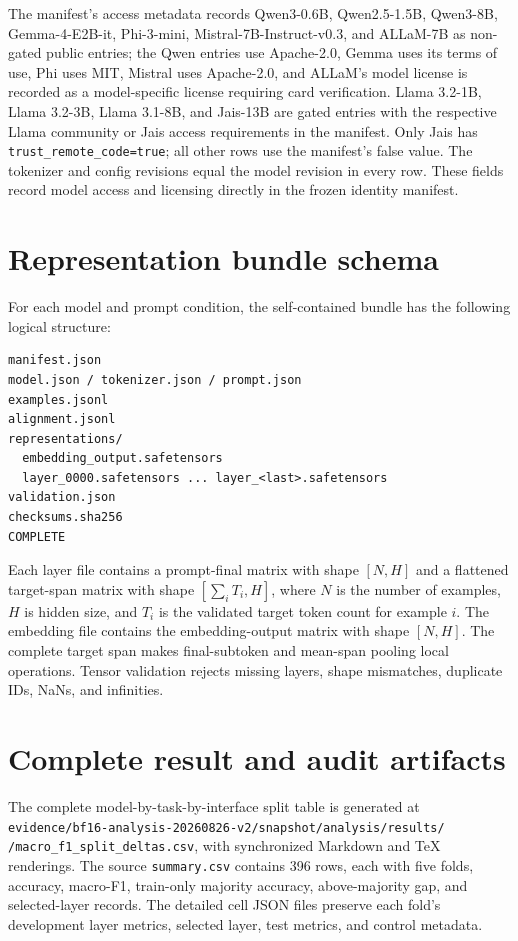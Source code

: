 \documentclass[pdflatex,sn-basic]{sn-jnl}
\begin{document}
The manifest's access metadata records Qwen3-0.6B, Qwen2.5-1.5B, Qwen3-8B,
Gemma-4-E2B-it, Phi-3-mini, Mistral-7B-Instruct-v0.3, and ALLaM-7B as
non-gated public entries; the Qwen entries use Apache-2.0, Gemma uses its
terms of use, Phi uses MIT, Mistral uses Apache-2.0, and ALLaM's model license
is recorded as a model-specific license requiring card verification. Llama
3.2-1B, Llama 3.2-3B, Llama 3.1-8B, and Jais-13B are gated entries with the
respective Llama community or Jais access requirements in the manifest. Only
Jais has \texttt{trust\_remote\_code=true}; all other rows use the manifest's
false value. The tokenizer and config revisions equal the model revision in
every row. These fields record model access and licensing directly in the
frozen identity manifest.

\section{Representation bundle schema}\label{app:bundle-schema}

For each model and prompt condition, the self-contained bundle has the
following logical structure:

\begin{verbatim}
manifest.json
model.json / tokenizer.json / prompt.json
examples.jsonl
alignment.jsonl
representations/
  embedding_output.safetensors
  layer_0000.safetensors ... layer_<last>.safetensors
validation.json
checksums.sha256
COMPLETE
\end{verbatim}

Each layer file contains a prompt-final matrix with shape
$[N,H]$ and a flattened target-span matrix with shape $[\sum_i T_i,H]$,
where $N$ is the number of examples, $H$ is hidden size, and $T_i$ is the
validated target token count for example $i$. The embedding file contains the
embedding-output matrix with shape $[N,H]$. The complete target span makes
final-subtoken and mean-span pooling local operations. Tensor validation
rejects missing layers, shape mismatches, duplicate IDs, NaNs, and infinities.

\section{Complete result and audit artifacts}\label{app:artifacts}

The complete model-by-task-by-interface split table is generated at
\texttt{evidence/bf16-analysis-20260826-v2/snapshot/analysis/results/}
\texttt{/macro\_f1\_split\_deltas.csv}, with synchronized Markdown and TeX
renderings. The source \texttt{summary.csv} contains 396 rows, each with five
folds, accuracy, macro-F1, train-only majority accuracy, above-majority gap,
and selected-layer records. The detailed cell JSON files preserve each fold's
development layer metrics, selected layer, test metrics, and control metadata.
\end{document}
